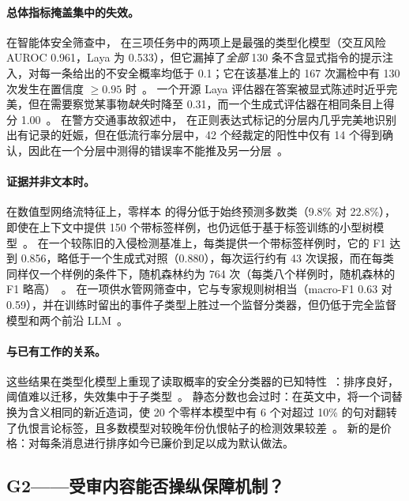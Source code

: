 \paragraph{总体指标掩盖集中的失效。}
在智能体安全筛查中，\jev{} 在三项任务中的两项上是最强的类型化模型（交互风险 AUROC 0.961，Laya 为 0.533），但它漏掉了\emph{全部} 130 条不含显式指令的提示注入，对每一条给出的不安全概率均低于 0.1；它在该基准上的 167 次漏检中有 130 次发生在置信度 $\geq 0.95$ 时~\cite{arx33401}。
一个开源 Laya 评估器在答案被显式陈述时近乎完美，但在需要察觉某事物\emph{缺失}时降至 0.31，而一个生成式评估器在相同条目上得分 1.00~\cite{zen22901853}\zmark{}。
在警方交通事故叙述中，\jev{} 在正则表达式标记的分层内几乎完美地识别出有记录的妊娠，但在低流行率分层中，42 个经裁定的阳性中仅有 14 个得到确认，因此在一个分层中测得的错误率不能推及另一分层~\cite{arx00213}。

\paragraph{证据并非文本时。}
在数值型网络流特征上，零样本 \jev{} 的得分低于始终预测多数类（9.8\% 对 22.8\%），即使在上下文中提供 150 个带标签样例，也仍远低于基于标签训练的小型树模型~\cite{arx00376}。
在一个较陈旧的入侵检测基准上，每类提供一个带标签样例时，它的 F1 达到 0.856，略低于一个生成式对照（0.880），每次运行约有 43 次误报，而在每类同样仅一个样例的条件下，随机森林约为 764 次（每类八个样例时，随机森林的 F1 略高）~\cite{arx01079}。
在一项供水管网筛查中，它与专家规则树相当（macro-F1 0.63 对 0.59），并在训练时留出的事件子类型上胜过一个监督分类器，但仍低于完全监督模型和两个前沿 LLM~\cite{arx02048}。

\paragraph{与已有工作的关系。}
这些结果在类型化模型上重现了读取概率的安全分类器的已知特性~\cite{inan2023llama,markov2023holistic}：排序良好，阈值难以迁移，失效集中于子类型~\cite{rottger2021hatecheck}。
静态分数也会过时：在英文中，将一个词替换为含义相同的新近造词，使 20 个零样本模型中有 6 个对超过 10\% 的句对翻转了仇恨言论标签，且多数模型对较晚年份仇恨帖子的检测效果较差~\cite{dibonaventura2025hatevolution}。
新的是价格：对每条消息进行排序如今已廉价到足以成为默认做法。

\subsection{G2——受审内容能否操纵保障机制？}
\label{sec:g2}

